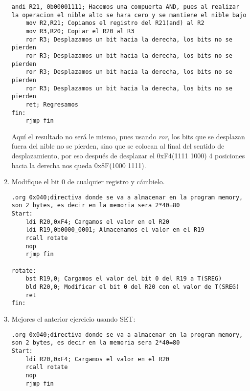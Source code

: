 \documentclass[
	12pt, %
	fleqn, %
	a4paper, %
]{LegrandOrangeBook}
\begin{document}
\begin{enumerate}
\begin{lstlisting}[language={[x86masm]Assembler},frame=single,caption={Usando ROR},captionpos=b,numbers=none]
	andi R21, 0b00001111; Hacemos una compuerta AND, pues al realizar la operacion el nible alto se hara cero y se mantiene el nible bajo
	mov R2,R21; Copiamos el registro del R21(and) al R2
	mov R3,R20; Copiar el R20 al R3
	ror R3; Desplazamos un bit hacia la derecha, los bits no se pierden
	ror R3; Desplazamos un bit hacia la derecha, los bits no se pierden
	ror R3; Desplazamos un bit hacia la derecha, los bits no se pierden
	ror R3; Desplazamos un bit hacia la derecha, los bits no se pierden
	ret; Regresamos
fin:
	rjmp fin
\end{lstlisting}
Aquí el resultado no será le mismo, pues usando \textit{ror}, los bits que se desplazan fuera del nible no se pierden, sino que se colocan al final del sentido de desplazamiento, por eso después de desplazar el 0xF4(1111 1000) 4 posiciones hacia la derecha nos queda 0x8F(1000 1111).
\item Modifique el bit 0 de cualquier registro y cámbielo.
\begin{lstlisting}[language={[x86masm]Assembler},frame=single,caption={Uso de la función BST y BSI para cambiar bits específicos},captionpos=b,numbers=none]
.org 0x040;directiva donde se va a almacenar en la program memory, son 2 bytes, es decir en la memoria sera 2*40=80
Start:
	ldi R20,0xF4; Cargamos el valor en el R20
	ldi R19,0b0000_0001; Almacenamos el valor en el R19
	rcall rotate
	nop
	rjmp fin

rotate:
	bst R19,0; Cargamos el valor del bit 0 del R19 a T(SREG)
	bld R20,0; Modificar el bit 0 del R20 con el valor de T(SREG)
	ret
fin:
\end{lstlisting}
\item Mejores el anterior ejercicio usando SET:
\begin{lstlisting}[language={[x86masm]Assembler},frame=single,caption={Uso del SET para modificar T(SREG)},captionpos=b,numbers=none]
.org 0x040;directiva donde se va a almacenar en la program memory, son 2 bytes, es decir en la memoria sera 2*40=80
Start:
	ldi R20,0xF4; Cargamos el valor en el R20
	rcall rotate
	nop
	rjmp fin


\end{lstlisting}
\end{enumerate}
\end{document}
